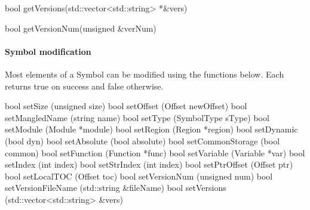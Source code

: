 \begin{apient}
bool getVersions(std::vector<std::string> *&vers)
\end{apient}

\begin{apient}
bool getVersionNum(unsigned &verNum)
\end{apient}

\paragraph{Symbol modification}

Most elements of a Symbol can be modified using the functions below. Each returns true on success and false otherwise. 

\begin{apient}
bool setSize (unsigned size)
bool setOffset (Offset newOffset)
bool setMangledName (string name)
bool setType (SymbolType sType)
bool setModule (Module *module)
bool setRegion (Region *region)
bool setDynamic (bool dyn)
bool setAbsolute (bool absolute)
bool setCommonStorage (bool common) 
bool setFunction (Function *func)
bool setVariable (Variable *var)
bool setIndex (int index)
bool setStrIndex (int index)
bool setPtrOffset (Offset ptr)
bool setLocalTOC (Offset toc)
bool setVersionNum (unsigned num)
bool setVersionFileName (std::string &fileName)
bool setVersions (std::vector<std::string> &vers)
\end{apient}
